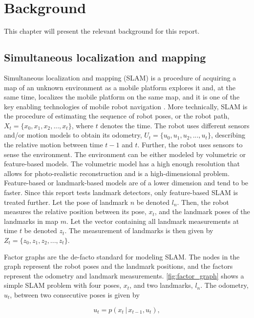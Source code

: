 \chapter{Background}

This chapter will present the relevant background for this report. 

\section{Simultaneous localization and mapping}

Simultaneous localization and mapping (SLAM) is a procedure of acquiring a map of an unknown environment as a mobile platform explores it and, at the same time, localizes the mobile platform on the same map, and it is one of the key enabling technologies of mobile robot navigation \cite{Stachniss2016SimultaneousMapping}. More technically, SLAM is the procedure of estimating the sequence of robot poses, or the robot path, $X_t = \{x_0, x_1, x_2,...,x_t\}$, where $t$ denotes the time. The robot uses different sensors and/or motion models to obtain its odometry, $U_t = \{u_0, u_1, u_2,...,u_t\}$, describing the relative motion between time $t-1$ and $t$. Further, the robot uses sensors to sense the environment. The environment can be either modeled by volumetric or feature-based models. The volumetric model has a high enough resolution that allows for photo-realistic reconstruction and is a high-dimensional problem. Feature-based or landmark-based models are of a lower dimension and tend to be faster. Since this report tests landmark detectors, only feature-based SLAM is treated further. Let the pose of landmark $n$ be denoted $l_n$. Then, the robot measures the relative position between its pose, $x_t$, and the landmark poses of the landmarks in map $m$. Let the vector containing all landmark measurements at time $t$ be denoted $z_t$. The measurement of landmarks is then given by $Z_t = \{z_0, z_1, z_2,...,z_t\}$.

Factor graphs are the de-facto standard for modeling SLAM. The nodes in the graph represent the robot poses and the landmark positions, and the factors represent the odometry and landmark measurements. \cref{fig:factor_graph} shows a simple SLAM problem with four poses, $x_t$, and two landmarks, $l_n$. The odometry, $u_t$, between two consecutive poses is given by

\begin{equation}
    u_t = p(x_t \,|\, x_{t-1},u_t),
    \label{eq:odom_pdf}
\end{equation}

